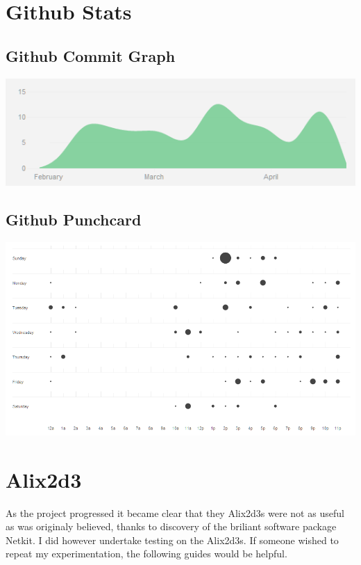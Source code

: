 \chapter{Github Stats}
\label{GithubStats}

\section{Github Commit Graph}
\begin{center}
	\includegraphics[width=\linewidth]{../Diagrams/Stats/GitHubCommitGraph.png}
\end{center}

\section{Github Punchcard}
\begin{center}
	\includegraphics[width=\linewidth]{../Diagrams/Stats/GitHubPunchCard.png}
\end{center}

\chapter{Alix2d3}
As the project progressed it became clear that they Alix2d3s were not as useful
as was originaly believed, thanks to discovery of the briliant software package
Netkit. I did however undertake testing on the Alix2d3s. If someone wished to
repeat my experimentation, the following guides would be helpful. 

